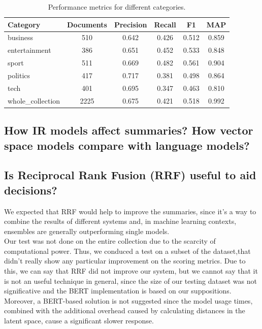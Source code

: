 \begin{center}
    \begin{table}[H]
        \centering
        \begin{tabular}{|l|c|c|c|c|c|}
            \hline
            Category          & Documents & Precision & Recall & F1    & MAP   \\
            \hline
            business          & 510       & 0.642     & 0.426  & 0.512 & 0.859 \\
            entertainment     & 386       & 0.651     & 0.452  & 0.533 & 0.848 \\
            sport             & 511       & 0.669     & 0.482  & 0.561 & 0.904 \\
            politics          & 417       & 0.717     & 0.381  & 0.498 & 0.864 \\
            tech              & 401       & 0.695     & 0.347  & 0.463 & 0.810 \\
            \hline
            whole\_collection & 2225      & 0.675     & 0.421  & 0.518 & 0.992 \\
            \hline
        \end{tabular}
        \caption{Performance metrics for different categories.}
        \label{tab:performance}
    \end{table}
\end{center}

\subsection{How IR models affect summaries? How vector space models compare with language models?}

\subsection{Is Reciprocal Rank Fusion (RRF) useful to aid decisions?}
We expected that RRF would help to improve the summaries, since it's a way to
combine the results of different systems and, in machine learning contexts,
ensembles are generally outperforming single models. \\ Our test was not done
on the entire collection due to the scarcity of computational power. Thus, we
conduced a test on a subset of the dataset,that didn't really show any
particular improvement on the scoring metrics. Due to this, we can say that RRF
did not improve our system, but we cannot say that it is not an useful technique in general, since the size
of our testing dataset was not significative and the BERT implementation is
based on our suppositions. Moreover, a BERT-based solution is not suggested
since the model usage times, combined with the additional overhead caused by
calculating distances in the latent space, cause a significant slower response.


